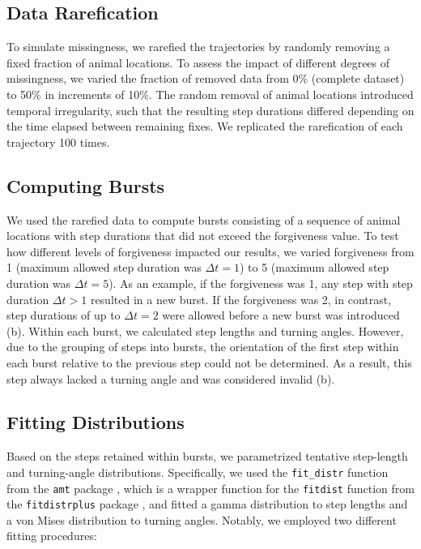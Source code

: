 \documentclass[abstract=on,10pt,a4paper,bibliography=totocnumbered]{article}
\begin{document}
\subsection{Data Rarefication}

To simulate missingness, we rarefied the trajectories by randomly removing a
fixed fraction of animal locations. To assess the impact of different degrees of
missingness, we varied the fraction of removed data from 0\% (complete dataset)
to 50\% in increments of 10\%. The random removal of animal locations introduced
temporal irregularity, such that the resulting step durations differed depending
on the time elapsed between remaining fixes. We replicated the rarefication of
each trajectory 100 times.

\subsection{Computing Bursts}

We used the rarefied data to compute bursts consisting of a sequence of
animal locations with step durations that did not exceed the forgiveness value.
To test how different levels of forgiveness impacted our results, we varied
forgiveness from 1 (maximum allowed step duration was $\Delta t = 1$) to 5
(maximum allowed step duration was $\Delta t = 5$). As an example, if the
forgiveness was 1, any step with step duration $\Delta t > 1$ resulted in a new
burst. If the forgiveness was 2, in contrast, step durations of up to $\Delta t
= 2$ were allowed before a new burst was introduced (b). Within
each burst, we calculated step lengths and turning angles. However, due to the
grouping of steps into bursts, the orientation of the first step within each
burst relative to the previous step could not be determined. As a result, this
step always lacked a turning angle and was considered invalid
(b).

\subsection{Fitting Distributions}

Based on the steps retained within bursts, we parametrized tentative step-length
and turning-angle distributions. Specifically, we used the \texttt{fit\_distr}
function from the \texttt{amt} package \citep{Signer.2019}, which is a wrapper
function for the \texttt{fitdist} function from the \texttt{fitdistrplus}
package \citep{Delignette-Muller.2015}, and fitted a gamma distribution to
step lengths and a von Mises distribution to turning angles. Notably, we
employed two different fitting procedures:
\end{document}
